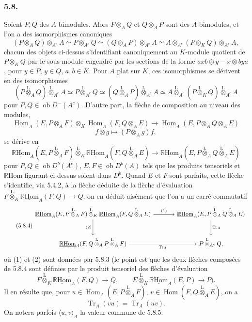\documentclass[11pt]{article}
\DeclareMathOperator{\Hom}{Hom}
\newcommand{\R}{\mathbb{R}}\newcommand{\RHomCore}{\mathbb{R}\mathrm{Hom}}
\newcommand{\ob}{\operatorname{ob}}
\providecommand{\RHom}{\RHomCore}
\providecommand{\uRHom}{\underline{\RHom}}
\providecommand{\uHom}{\underline{\Hom}}
\providecommand{\Tr}{\operatorname{Tr}}
\providecommand{\Tr}{\operatorname{Tr}}
\providecommand{\lten}{\overset{\mathrm L}{\otimes}}
\providecommand{\Tr}{\operatorname{Tr}}
\providecommand{\RHom}{\RHomCore}
\providecommand{\Hom}{\operatorname{Hom}}
\providecommand{\ob}{\operatorname{ob}}
\providecommand{\lten}{\overset{\mathrm L}{\otimes}}
\providecommand{\RHom}{\R\mathcal{H}om}
\providecommand{\lten}{\overset{\mathrm L}{\otimes}}
\providecommand{\R}{\mathrm R}
\providecommand{\Tr}{\operatorname{Tr}}
\providecommand{\lten}{\overset{\mathrm L}{\otimes}}
\providecommand{\lten}{\overset{\mathrm L}{\otimes}}
\providecommand{\lten}{\overset{\mathrm L}{\otimes}}
\providecommand{\RHom}{\RHomCore}
\providecommand{\Hom}{\operatorname{Hom}}
\providecommand{\Tr}{\operatorname{Tr}}
\providecommand{\lten}{\overset{\mathrm L}{\otimes}}
\begin{document}
\subsubsection*{5.8.}

Soient $P,Q$ des $A$-bimodules. Alors $P\otimes_AQ$ et $Q\otimes_AP$ sont des $A$-bimodules, et l'on a des isomorphismes canoniques
\begin{equation}\tag{5.8.1}
(P\otimes_AQ)\otimes_{A^e}A\simeq P\otimes_{A^e}Q\simeq(Q\otimes_AP)\otimes_{A^e}A\simeq A\otimes_{A^e}(P\otimes_KQ)\otimes_{A^e}A,
\end{equation}
chacun des objets ci-dessus s'identifiant canoniquement au $K$-module quotient de $P\otimes_KQ$ par le sous-module engendré par les sections de la forme $axb\otimes y-x\otimes bya$, pour $y\in P$, $y\in Q$, $a,b\in K$. Pour $A$ plat sur $K$, ces isomorphismes se dérivent en des isomorphismes
\begin{equation}\tag{5.8.2}
(P\lten_AQ)\lten_{A^e}A\simeq P\lten_{A^e}Q\simeq(Q\lten_AP)\lten_{A^e}A\simeq A\lten_{A^e}(P\lten_KQ)\lten_{A^e}A
\end{equation}
pour $P,Q\in\ob D^-(A^e)$. D'autre part, la flèche de composition au niveau des modules,
\[
\uHom_A(E,P\otimes_AF)\otimes_K\uHom_A(F,Q\otimes_AE)
\longrightarrow\uHom_A(E,P\otimes_AQ\otimes_AE)
\]
\[
f\otimes g\longmapsto (P\otimes_Ag)f,
\]
se dérive en
\begin{equation}\tag{5.8.3}
\uRHom_A(E,P\lten_AF)\lten_K\uRHom_A(F,Q\lten_AE)
\longrightarrow\uRHom_A(E,P\lten_AQ\lten_AE)
\end{equation}
pour $P,Q\in\ob D^b(A^e)$, $E,F\in\ob D^b(A)$ tels que les produits tensoriels et $\uRHom$ figurant ci-dessus soient dans $D^b$. Quand $E$ et $F$ sont parfaits, cette flèche s'identifie, via 5.4.2, à la flèche déduite de la flèche d'évaluation $F\lten_K\uRHom_A(F,Q)\to Q$; on en déduit aisément que l'on a un carré commutatif
\begin{equation}\tag{5.8.4}
\begin{tikzcd}[column sep=large,row sep=large]
\uRHom_A(E,P\lten_AF)\lten_K\uRHom_A(F,Q\lten_AE) \arrow[r,"(1)"] \arrow[d,"(2)"'] & \uRHom_A(E,P\lten_AQ\lten_AE) \arrow[d,"\Tr_A"]\\
\uRHom_A(F,Q\lten_AP\lten_AF) \arrow[r,"\Tr_A"'] & P\lten_{A^e}Q,
\end{tikzcd}
\end{equation}
où (1) et (2) sont données par 5.8.3 (le point est que les deux flèches composées de 5.8.4 sont définies par le produit tensoriel des flèches d'évaluation
\[
F\lten_K\uRHom_A(F,Q)\longrightarrow Q,\qquad
E\lten_K\uRHom_A(E,P)\longrightarrow P).
\]
Il en résulte que, pour $u\in\Hom_A(E,P\lten_AF)$, $v\in\Hom(F,Q\lten_AE)$, on a
\begin{equation}\tag{5.8.5}
\Tr_A(vu)=\Tr_A(uv).
\end{equation}
On notera parfois $\langle u,v\rangle_A$ la valeur commune de 5.8.5.
\end{document}
